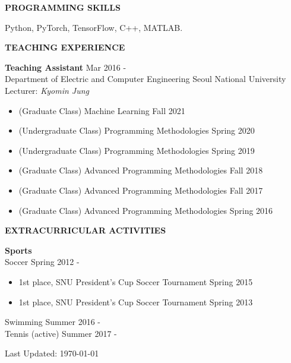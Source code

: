\documentclass[12pt]{article}
\begin{document}
\begin{center}
	{\noindent \bfseries PROGRAMMING SKILLS}
    \noindent\makebox[\linewidth]{\rule{0.75\paperwidth}{0.4pt}}
\end{center}
\noindent
Python, PyTorch, TensorFlow, C++, MATLAB. 
\vspace{0.2in} %


\begin{center}
	{\noindent \bfseries TEACHING EXPERIENCE}
    \noindent\makebox[\linewidth]{\rule{0.75\paperwidth}{0.4pt}}
\end{center}

\noindent
{\bfseries Teaching Assistant} \hfill Mar 2016 -  \\ 
\noindent Department of Electric and Computer Engineering \hfill Seoul National University \\ 
\noindent Lecturer: \textit{Kyomin Jung}
\vspace{6pt}
\begin{itemize} \itemsep -2pt %
	\item (Graduate Class) Machine Learning \hfill Fall 2021
	\item (Undergraduate Class) Programming Methodologies \hfill Spring 2020
	\item (Undergraduate Class) Programming Methodologies \hfill Spring 2019
	\item (Graduate Class) Advanced Programming Methodologies \hfill Fall 2018
	\item (Graduate Class) Advanced Programming Methodologies \hfill Fall 2017
	\item (Graduate Class) Advanced Programming Methodologies \hfill Spring 2016
\end{itemize}


\vspace{0.2in} %


\begin{center}
	{\noindent \bfseries EXTRACURRICULAR ACTIVITIES}
    \noindent\makebox[\linewidth]{\rule{0.75\paperwidth}{0.4pt}}
\end{center}

\noindent
{\bfseries Sports} \\ 
\noindent Soccer \hfill Spring 2012 -
\begin{itemize} \itemsep -2pt %
	\item 1st place, SNU President's Cup Soccer Tournament \hfill Spring 2015
	\item 1st place, SNU President's Cup Soccer Tournament \hfill Spring 2013
\end{itemize}
\noindent Swimming \hfill Summer 2016 - \\ 
\noindent Tennis (active) \hfill Summer 2017 - \\

\vspace{0.2in} %

Last Updated: \monthdayyeardate\today
\end{document}
